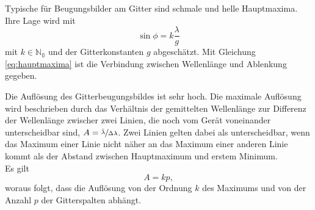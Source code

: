 
%
Typische für Beugungsbilder am Gitter sind schmale und helle Hauptmaxima.
Ihre Lage wird mit 
\begin{equation}
	\sin{\phi}= k\frac{\lambda}{g} 
	\label{eq:hauptmaxima}
\end{equation}
mit $k\in\mathbb{N_0}$ und der Gitterkonstanten $g$ abgeschätzt.
Mit Gleichung \eqref{eq:hauptmaxima} ist die Verbindung zwischen Wellenlänge und Ablenkung gegeben.

Die Auflösung des Gitterbeugungsbildes ist sehr hoch.
Die maximale Auflösung wird beschrieben durch das Verhältnis der gemittelten Wellenlänge zur Differenz der Wellenlänge
zwischer zwei Linien, die noch vom Gerät voneinander unterscheidbar sind, $A=\sfrac{\bar\lambda}{\Delta\lambda}$.
Zwei Linien gelten dabei als unterscheidbar, wenn das Maximum einer Linie nicht näher an das Maximum einer anderen Linie kommt als der Abstand zwischen Hauptmaximum und erstem Minimum.\\
Es gilt
\begin{equation}
	A=kp,
\end{equation}
woraus folgt, dass die Auflösung von der Ordnung $k$ des Maximums und von der Anzahl $p$ der Gitterspalten abhängt.